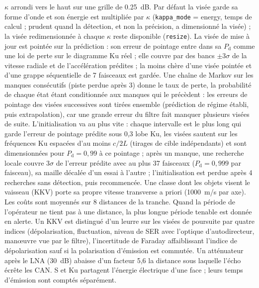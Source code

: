 \documentclass[11pt,a4paper]{article}
\newcommand{\code}[1]{\texttt{\small #1}}
\newcommand{\Pd}{P_{\mathrm d}}
\begin{document}
$\kappa$ arrondi vers le haut sur une grille de \SI{0.25}{dB}. Par défaut la visée garde sa forme d'onde et son énergie
est multipliée par $\kappa$ (\code{kappa\_mode} = energy, temps de calcul ; prudent quand la détection, et non la
précision, a dimensionné la visée) ; la visée redimensionnée à chaque $\kappa$ reste disponible (\code{resize}). La visée de mise à jour est pointée sur la prédiction :
son erreur de pointage entre dans sa $\Pd$ comme une loi de perte sur le diagramme Ku réel ; elle couvre par des bancs
$\pm 3\sigma$ de la vitesse radiale et de l'accélération prédites ; la moins chère d'une visée pointée et d'une grappe
séquentielle de 7 faisceaux est gardée. Une chaîne de Markov sur les manques consécutifs (piste perdue après 3) donne
le taux de perte, la probabilité de chaque état étant conditionnée aux manques qui le précèdent : les erreurs de
pointage des visées successives sont tirées ensemble (prédiction de régime établi, puis extrapolation), car une
grande erreur du filtre fait manquer plusieurs visées de suite. L'initialisation va au plus vite : chaque intervalle est
le plus long qui garde l'erreur de pointage prédite sous 0,3 lobe Ku, les visées sautent sur les fréquences Ku espacées
d'au moins $c/2L$ (tirages de cible indépendants) et sont dimensionnées pour $\Pd = 0,99$ à ce pointage ; après un
manque, une recherche locale couvre $3\sigma$ de l'erreur prédite avec au plus 37 faisceaux ($\Pd = 0,999$ par
faisceau), sa maille décalée d'un essai à l'autre ; l'initialisation est perdue après 4 recherches sans détection, puis
recommencée. Une classe dont les objets visent le vaisseau (KKV) porte sa propre vitesse transverse a priori
(\SI{1000}{m/s} par axe). Les coûts sont moyennés sur 8 distances de la tranche. Quand la période de l'opérateur ne tient pas à une
distance, la plus longue période tenable est donnée en alerte. Un KKV est distingué d'un leurre sur les visées de
poursuite par quatre indices (dépolarisation, fluctuation, niveau de SER avec l'optique d'autodirecteur, man\oe{}uvre vue par
le filtre), l'incertitude de Faraday affaiblissant l'indice de dépolarisation sauf si la polarisation d'émission est
commutée. Un atténuateur après le LNA (\SI{30}{dB}) abaisse d'un facteur 5,6 la distance sous laquelle l'écho écrête les
CAN. S et Ku partagent l'énergie électrique d'une face ; leurs temps d'émission sont comptés séparément.
\end{document}
